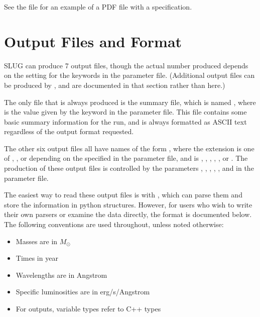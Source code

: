 \documentclass[letterpaper,10pt,english]{sphinxmanual}
\begin{document}
See the file  for an example of a PDF file with a  specification.


\chapter{Output Files and Format}
\label{output:output-files-and-format}\label{output::doc}\label{output:sec-output}
SLUG can produce 7 output files, though the actual number produced depends on the setting for the  keywords in the parameter file. (Additional output files can be produced by {\hyperref[cloudy:sec-cloudy-slug]{\emph{}}}, and are documented in that section rather than here.)

The only file that is always produced is the summary file, which is named , where  is the value given by the  keyword in the parameter file. This file contains some basic summary information for the run, and is always formatted as ASCII text regardless of the output format requested.

The other six output files all have names of the form , where the extension  is one of , , or  depending on the  specified in the parameter file, and  is , , , , , or . The production of these output files is controlled by the parameters , , , , , and  in the parameter file.

The easiest way to read these output files is with {\hyperref[slugpy:sec-slugpy]{\emph{}}}, which can parse them and store the information in python structures. However, for users who wish to write their own parsers or examine the data directly, the format is documented below. The following conventions are used throughout, unless noted otherwise:
\begin{itemize}
\item {} 
Masses are in \(M_\odot\)

\item {} 
Times in year

\item {} 
Wavelengths are in Angstrom

\item {} 
Specific luminosities are in erg/s/Angstrom

\item {} 
For  outputs, variable types refer to C++ types

\end{itemize}
\end{document}
